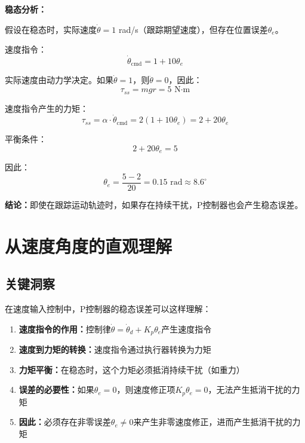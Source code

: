 \documentclass[12pt,a4paper]{article}
\begin{document}
\textbf{稳态分析：}

假设在稳态时，实际速度$\dot{\theta} = 1$ rad/s（跟踪期望速度），但存在位置误差$\theta_e$。

速度指令：
\begin{equation}
\dot{\theta}_{\text{cmd}} = 1 + 10 \theta_e
\end{equation}

实际速度由动力学决定。如果$\dot{\theta} = 1$，则$\ddot{\theta} = 0$，因此：
\begin{equation}
\tau_{ss} = mgr = 5 \text{ N·m}
\end{equation}

速度指令产生的力矩：
\begin{equation}
\tau_{ss} = \alpha \cdot \dot{\theta}_{\text{cmd}} = 2(1 + 10 \theta_e) = 2 + 20 \theta_e
\end{equation}

平衡条件：
\begin{equation}
2 + 20 \theta_e = 5
\end{equation}

因此：
\begin{equation}
\theta_e = \frac{5 - 2}{20} = 0.15 \text{ rad} \approx 8.6^\circ
\end{equation}

\textbf{结论：}即使在跟踪运动轨迹时，如果存在持续干扰，P控制器也会产生稳态误差。

\section{从速度角度的直观理解}

\subsection{关键洞察}

在速度输入控制中，P控制器的稳态误差可以这样理解：

\begin{enumerate}
\item \textbf{速度指令的作用：}控制律$\dot{\theta} = \dot{\theta}_d + K_p \theta_e$产生速度指令
\item \textbf{速度到力矩的转换：}速度指令通过执行器转换为力矩
\item \textbf{力矩平衡：}在稳态时，这个力矩必须抵消持续干扰（如重力）
\item \textbf{误差的必要性：}如果$\theta_e = 0$，则速度修正项$K_p \theta_e = 0$，无法产生抵消干扰的力矩
\item \textbf{因此：}必须存在非零误差$\theta_e \neq 0$来产生非零速度修正，进而产生抵消干扰的力矩
\end{enumerate}
\end{document}
